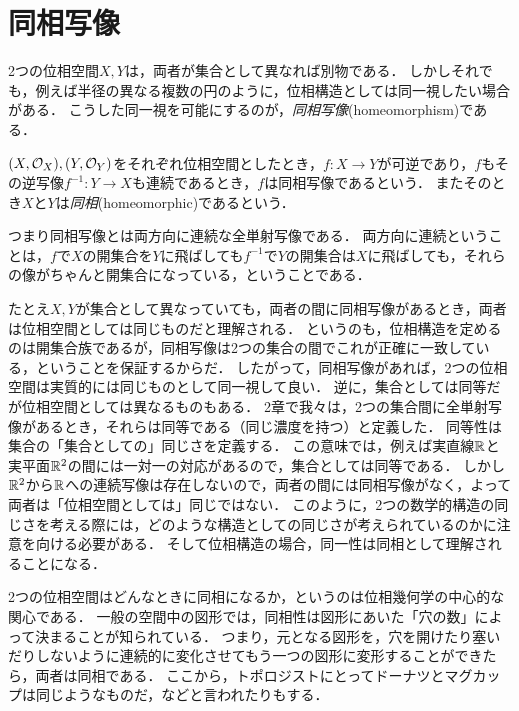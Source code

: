 \documentclass[11pt,a4paper]{jsarticle}
\begin{document}



\section{同相写像}
2つの位相空間$X, Y$は，両者が集合として異なれば別物である．
しかしそれでも，例えば半径の異なる複数の円のように，位相構造としては同一視したい場合がある．
こうした同一視を可能にするのが，\emph{同相写像}(homeomorphism)である．

\begin{dfn}[同相写像]
$(X, \mathcal{O}_X), (Y, \mathcal{O}_Y)$をそれぞれ位相空間としたとき，$f:X \to Y$が可逆であり，$f$もその逆写像$f^{-1}:Y \to X$も連続であるとき，$f$は同相写像であるという．
またそのとき$X$と$Y$は\emph{同相}(homeomorphic)であるという．
\end{dfn}

つまり同相写像とは両方向に連続な全単射写像である．
両方向に連続ということは，$f$で$X$の開集合を$Y$に飛ばしても$f^{-1}$で$Y$の開集合は$X$に飛ばしても，それらの像がちゃんと開集合になっている，ということである．

たとえ$X, Y$が集合として異なっていても，両者の間に同相写像があるとき，両者は位相空間としては同じものだと理解される．
というのも，位相構造を定めるのは開集合族であるが，同相写像は2つの集合の間でこれが正確に一致している，ということを保証するからだ．
したがって，同相写像があれば，2つの位相空間は実質的には同じものとして同一視して良い．
逆に，集合としては同等だが位相空間としては異なるものもある．
2章で我々は，2つの集合間に全単射写像があるとき，それらは同等である（同じ濃度を持つ）と定義した．
同等性は集合の「集合としての」同じさを定義する．
この意味では，例えば実直線$\mathbb{R}$と実平面$\mathbb{R}^2$の間には一対一の対応があるので，集合としては同等である．
しかし$\mathbb{R}^2$から$\mathbb{R}$への連続写像は存在しないので，両者の間には同相写像がなく，よって両者は「位相空間としては」同じではない．
このように，2つの数学的構造の同じさを考える際には，どのような構造としての同じさが考えられているのかに注意を向ける必要がある．
そして位相構造の場合，同一性は同相として理解されることになる．


\begin{develop}
2つの位相空間はどんなときに同相になるか，というのは位相幾何学の中心的な関心である．
一般の空間中の図形では，同相性は図形にあいた「穴の数」によって決まることが知られている．
つまり，元となる図形を，穴を開けたり塞いだりしないように連続的に変化させてもう一つの図形に変形することができたら，両者は同相である．
ここから，トポロジストにとってドーナツとマグカップは同じようなものだ，などと言われたりもする．
\end{develop}
\end{document}
